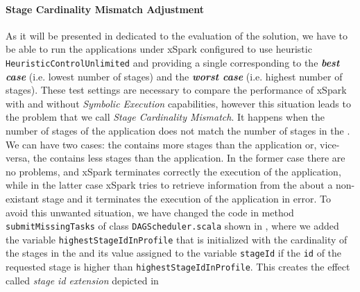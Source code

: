 

\paragraph{Stage Cardinality Mismatch Adjustment}
As it will be presented in  dedicated to the evaluation of the solution, we have to be able to run the applications under xSpark configured to use heuristic \texttt{HeuristicControlUnlimited} and providing a single \plan corresponding to the \textbf\textit{best case} (i.e. lowest number of stages) and the \textbf\textit{worst case} (i.e. highest number of stages). These test settings are necessary to compare the performance of xSpark with and without \textit{Symbolic Execution} capabilities, however this situation leads  to the problem that we call \textit{Stage Cardinality Mismatch}. It happens when the number of stages of the application does not match the number of stages in the \plan. We can have two cases: the \plan contains more stages than the application or, vice-versa, the \plan contains less stages than the application. In the former case there are no problems, and  xSpark terminates correctly the execution of the application, while in the latter case xSpark tries to  retrieve information from the \plan about a non-existant stage and it terminates the execution of the application in error. To avoid this unwanted situation, we have changed the code in method \texttt{submitMissingTasks} of class \texttt{DAGScheduler.scala} shown in , where we added the variable \texttt{highestStageIdInProfile} that is initialized with the cardinality of the stages in the \plan and its value assigned to the variable \texttt{stageId} if the \texttt{id} of the requested stage is higher than \texttt{highestStageIdInProfile}. This creates the effect called \textit{stage id extension} depicted in 
